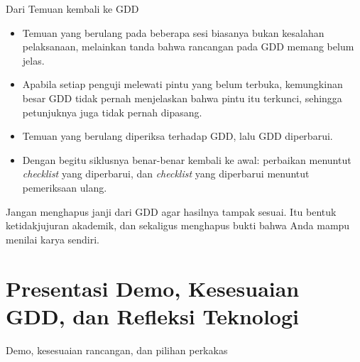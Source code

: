 \documentclass[aspectratio=169,10pt]{beamer}
\begin{document}
\begin{frame}{Dari Temuan kembali ke GDD}
\begin{itemize}
  \item Temuan yang berulang pada beberapa sesi biasanya bukan kesalahan
        pelaksanaan, melainkan tanda bahwa rancangan pada GDD memang belum
        jelas.
  \item Apabila setiap penguji melewati pintu yang belum terbuka, kemungkinan
        besar GDD tidak pernah menjelaskan bahwa pintu itu terkunci, sehingga
        petunjuknya juga tidak pernah dipasang.
  \item Temuan yang berulang diperiksa terhadap GDD, lalu GDD diperbarui.
  \item Dengan begitu siklusnya benar-benar kembali ke awal: perbaikan menuntut
        \emph{checklist} yang diperbarui, dan \emph{checklist} yang diperbarui
        menuntut pemeriksaan ulang.
\end{itemize}
\vspace{0.14cm}
\begin{kotak}
Jangan menghapus janji dari GDD agar hasilnya tampak sesuai. Itu bentuk
ketidakjujuran akademik, dan sekaligus menghapus bukti bahwa Anda mampu menilai
karya sendiri.
\end{kotak}
\end{frame}

\section{Presentasi Demo, Kesesuaian GDD, dan Refleksi Teknologi}
  {Demo, kesesuaian rancangan, dan pilihan perkakas}
\end{document}
